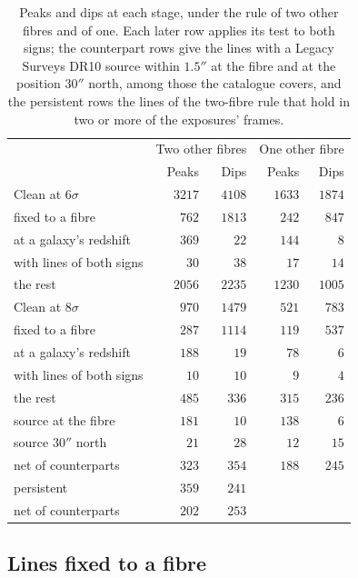 \documentclass[3p,11pt]{elsarticle}
\begin{document}
\begin{table}[t]
\centering\small
\caption{Peaks and dips at each stage, under the rule of two other fibres and of one.
Each later row applies its test to both signs; the counterpart rows give the lines with
a Legacy Surveys DR10 source within $1.5''$ at the fibre and at the position $30''$
north, among those the catalogue covers, and the persistent rows the lines of the
two-fibre rule that hold in two or more of the exposures' frames.}
\label{tab:counts}
\begin{tabular}{lrrrr}
\toprule
 & \multicolumn{2}{c}{Two other fibres} & \multicolumn{2}{c}{One other fibre} \\
 & Peaks & Dips & Peaks & Dips \\
\midrule
Clean at $6\sigma$ & $3217$ & $4108$ & $1633$ & $1874$ \\
\quad fixed to a fibre & $762$ & $1813$ & $242$ & $847$ \\
\quad at a galaxy's redshift & $369$ & $22$ & $144$ & $8$ \\
\quad with lines of both signs & $30$ & $38$ & $17$ & $14$ \\
\quad the rest & $2056$ & $2235$ & $1230$ & $1005$ \\
Clean at $8\sigma$ & $970$ & $1479$ & $521$ & $783$ \\
\quad fixed to a fibre & $287$ & $1114$ & $119$ & $537$ \\
\quad at a galaxy's redshift & $188$ & $19$ & $78$ & $6$ \\
\quad with lines of both signs & $10$ & $10$ & $9$ & $4$ \\
\quad the rest & $485$ & $336$ & $315$ & $236$ \\
\quad\quad source at the fibre & $181$ & $10$ & $138$ & $6$ \\
\quad\quad source $30''$ north & $21$ & $28$ & $12$ & $15$ \\
\quad\quad net of counterparts & $323$ & $354$ & $188$ & $245$ \\
\quad\quad persistent & $359$ & $241$ & & \\
\quad\quad\quad net of counterparts & $202$ & $253$ & & \\
\bottomrule
\end{tabular}
\end{table}

\subsection{Lines fixed to a fibre}
\end{document}
